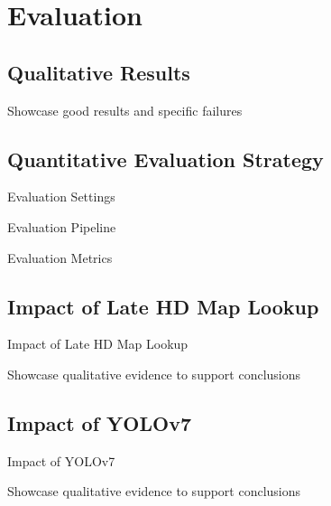 
\chapter{Evaluation}
\label{ch:evaluation}

\section{Qualitative Results}
\label{sec:qualres}

Showcase good results and specific failures

\newpage


\section{Quantitative Evaluation Strategy}
\label{sec:quant}

Evaluation Settings \par
Evaluation Pipeline \par
Evaluation Metrics

\newpage


\section{Impact of Late HD Map Lookup}
\label{sec:impactlatemap}

Impact of Late HD Map Lookup

\newpage

Showcase qualitative evidence to support conclusions

\newpage


\section{Impact of YOLOv7}
\label{sec:impactyolov7}

Impact of YOLOv7

\newpage

Showcase qualitative evidence to support conclusions

\newpage


